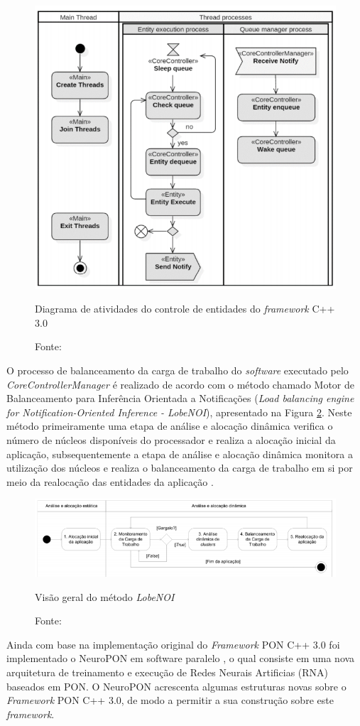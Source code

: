 \begin{figure}[!htb]
  \centering
  \includegraphics[width=.55\textwidth]{../figures/fw30_flow.png}
  \caption{Diagrama de atividades do controle de entidades do \textit{framework}
    C++ 3.0}
  \caption*{Fonte: }
  \label{fig:fw3_flow}
\end{figure}

O processo de balanceamento da carga de trabalho do \textit{software} executado
pelo \textit{CoreControllerManager} é realizado de acordo com o método chamado
Motor de Balanceamento para Inferência Orientada a Notificações (\textit{Load
balancing engine for Notification-Oriented Inference - LobeNOI}), apresentado na
Figura \ref{fig:lobenoi}. Neste método primeiramente uma etapa de análise e
alocação dinâmica verifica o número de núcleos disponíveis do processador e
realiza a alocação inicial da aplicação, subsequentemente a etapa de análise e
alocação dinâmica monitora a utilização dos núcleos e realiza o balanceamento da
carga de trabalho em si por meio da realocação das entidades da aplicação
\cite{belmonte_2016}.

\begin{figure}[!htb]
  \centering
  \includegraphics[width=\textwidth]{../figures/lobenoi.png}
  \caption{Visão geral do método \textit{LobeNOI}} \caption*{Fonte:
  }
  \label{fig:lobenoi}
\end{figure}

Ainda com base na implementação original do \textit{Framework} PON C++ 3.0 foi
implementado o NeuroPON em software paralelo \cite{schutz_2018}, o qual consiste
em uma nova arquitetura de treinamento e execução de Redes Neurais Artificias
(RNA) baseados em PON. O NeuroPON acrescenta algumas estruturas novas sobre o
\textit{Framework} PON C++ 3.0, de modo a permitir a sua construção sobre este
\textit{framework}.

